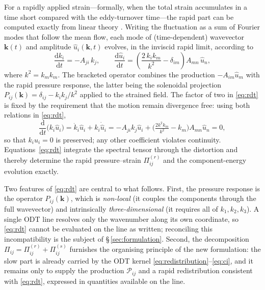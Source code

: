 \documentclass[lineno]{JFM-FLM_Au}
\begin{document}
For a rapidly applied strain---formally, when the total strain accumulates
in a time short compared with the eddy-turnover time---the rapid part can
be computed exactly from linear theory \citep{BatchelorProudman1954,
Hunt1973,HuntCarruthers1990}. Writing the fluctuation as a sum of Fourier
modes that follow the mean flow, each mode of (time-dependent) wavevector
$\boldsymbol{k}(t)$ and amplitude $\hat{u}_i(\boldsymbol{k},t)$ evolves,
in the inviscid rapid limit, according to
\begin{equation}
  \frac{\mathrm{d}k_i}{\mathrm{d}t}=-A_{ji}\,k_j,
  \qquad
  \frac{\mathrm{d}\hat{u}_i}{\mathrm{d}t}
  =\left(\frac{2\,k_i k_m}{k^2}-\delta_{im}\right)A_{mn}\,\hat{u}_n ,
  \label{eq:rdt}
\end{equation}
where $k^2=k_m k_m$. The bracketed operator combines the production
$-A_{im}\hat{u}_m$ with the rapid pressure response, the latter being the
solenoidal projection
$P_{ij}(\boldsymbol{k})=\delta_{ij}-k_ik_j/k^2$ applied to the strained
field. The factor of two in \eqref{eq:rdt} is fixed by the requirement that
the motion remain divergence free: using both relations in
\eqref{eq:rdt},
\begin{equation}
  \frac{\mathrm{d}}{\mathrm{d}t}\big(k_i\hat{u}_i\big)
  = \dot{k}_i\hat{u}_i + k_i\dot{\hat{u}}_i
  = -A_{ji}k_j\hat{u}_i
    + \Big(\tfrac{2k^2 k_m}{k^2}-k_m\Big)A_{mn}\hat{u}_n
  = 0,
  \label{eq:solenoidal}
\end{equation}
so that $k_i\hat{u}_i=0$ is preserved; any other coefficient violates
continuity. Equations~\eqref{eq:rdt} integrate the spectral tensor through
the distortion and thereby determine the rapid pressure--strain
$\Pi_{ij}^{(r)}$ and the component-energy evolution exactly.

Two features of \eqref{eq:rdt} are central to what follows. First, the
pressure response is the operator $P_{ij}(\boldsymbol{k})$, which is
\emph{non-local} (it couples the components through the full wavevector)
and intrinsically \emph{three-dimensional} (it requires all of $k_1,k_2,k_3$).
A single ODT line resolves only the wavenumber along its own coordinate,
so \eqref{eq:rdt} cannot be evaluated on the line as written; reconciling
this incompatibility is the subject of \S\,\ref{sec:formulation}. Second,
the decomposition $\Pi_{ij}=\Pi_{ij}^{(r)}+\Pi_{ij}^{(s)}$ furnishes the
organising principle of the new formulation: the slow part is already
carried by the ODT kernel \eqref{eq:redistribution}--\eqref{eq:ci}, and it
remains only to supply the production $\mathcal{P}_{ij}$ and a rapid
redistribution consistent with \eqref{eq:rdt}, expressed in quantities
available on the line.
\end{document}

